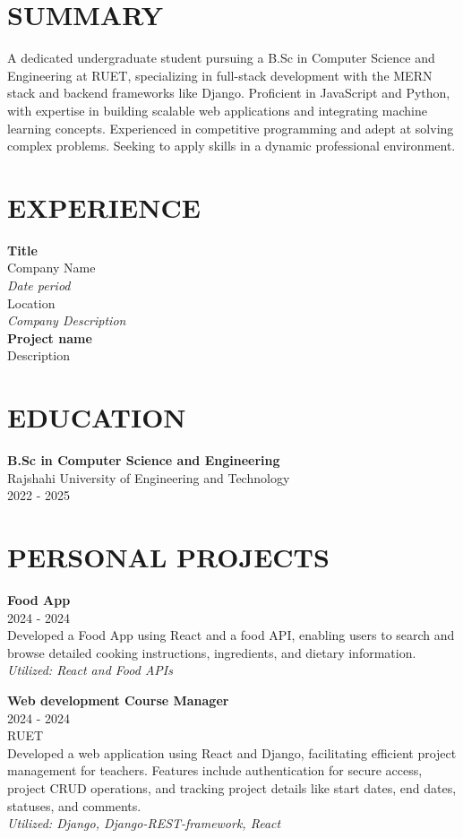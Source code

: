 \documentclass[a4paper,10pt]{article}
\begin{document}
\begin{multicols}{2}

\section*{SUMMARY}
A dedicated undergraduate student pursuing a B.Sc in Computer Science and Engineering at RUET, specializing in full-stack development with the MERN stack and backend frameworks like Django. Proficient in JavaScript and Python, with expertise in building scalable web applications and integrating machine learning concepts. Experienced in competitive programming and adept at solving complex problems. Seeking to apply skills in a dynamic professional environment.

\section*{EXPERIENCE}
\textbf{Title} \\
Company Name \\
\textit{Date period} \\
Location \\
\textit{Company Description} \\
\textbf{Project name} \\
Description

\section*{EDUCATION}
\textbf{B.Sc in Computer Science and Engineering} \\
Rajshahi University of Engineering and Technology \\
2022 - 2025

\section*{PERSONAL PROJECTS}
\textbf{Food App} \\
2024 - 2024 \\
Developed a Food App using React and a food API, enabling users to search and browse detailed cooking instructions, ingredients, and dietary information. \\
\textit{Utilized: React and Food APIs}

\textbf{Web development Course Manager} \\
2024 - 2024 \\
RUET \\
Developed a web application using React and Django, facilitating efficient project management for teachers. Features include authentication for secure access, project CRUD operations, and tracking project details like start dates, end dates, statuses, and comments. \\
\textit{Utilized: Django, Django-REST-framework, React}


\end{multicols}
\end{document}
